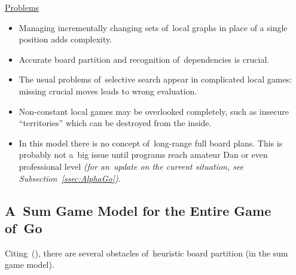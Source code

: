 \underline{Problems}
\begin{itemize}[-]
  \item Managing incrementally changing sets of~local graphs in place of a single position adds complexity.
  \item Accurate board partition and recognition of~dependencies is crucial.
  \item The usual problems of~selective search appear in complicated local games:
    missing crucial moves leads to wrong evaluation.
  \item Non-constant local games may be overlooked completely, such as insecure ``territories'' which can be destroyed from the inside.
  \item In this model there is no concept of~long-range full board plans.
    This is probably not a~big issue until programs reach amateur Dan or even professional level \textit{(for an~update on the current situation, see Subsection~\ref{ssec:AlphaGo})}.
\end{itemize}

\subsection{A~Sum Game Model for the Entire Game of~Go}

Citing~(\cite{Muller1995computer}), there are several obstacles of~heuristic board partition (in the sum game model).

